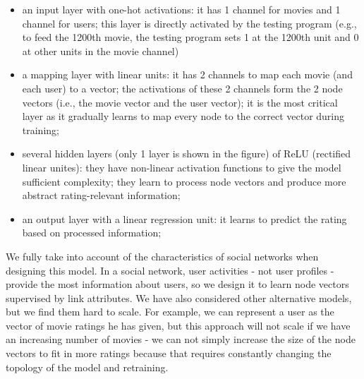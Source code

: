 \documentclass{article}
\begin{document}
\begin{itemize}
	\item an input layer with one-hot activations: it has 1 channel for movies 
	and 1 channel for users;
	this layer is directly activated by the testing program (e.g., to feed the 
	1200th movie, the testing program sets 1 at the 1200th unit and 0 at other 	
	units in the movie channel)
	\item a mapping layer with linear units: it has 2 channels to map each 
	movie (and each user) to a vector;
	the activations of these 2 channels form the 2 node vectors (i.e., the 
	movie vector and the user vector);
	it is the most critical layer as it gradually learns to map every node to 
	the correct vector during training;
	\item several hidden layers (only 1 layer is shown in the figure) of 
	ReLU (rectified linear unites):
	they have non-linear activation functions to give the model sufficient 
	complexity; 
	they learn to process node vectors and produce more abstract 
	rating-relevant information;
	\item an output layer with a linear regression unit: it learns to predict 
	the rating based on processed information;
\end{itemize}
We fully take into account of the characteristics of social networks when 
designing this model. In a social network, user activities - not user profiles 
- provide the most information about users, so we design it to learn node 
vectors supervised by link attributes.
We have also considered other alternative models, but we find 
them hard to scale. For example, we can represent a user as the vector of movie 
ratings he has given, but this approach will not scale if we have an increasing 
number of movies - we can not simply increase the size of the node vectors to 
fit 
in more ratings because that requires constantly changing the topology of the 
model and retraining.
\end{document}
